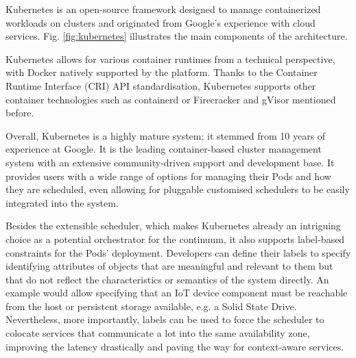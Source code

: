 Kubernetes \cite{kubernetes} is an open-source framework designed to manage containerized workloads on clusters and originated from Google's experience with cloud services. Fig. \ref{fig:kubernetes} illustrates the main components of the architecture.


Kubernetes allows for various container runtimes from a technical perspective, with Docker natively supported by the platform. Thanks to the Container Runtime Interface (CRI) API standardisation, Kubernetes supports other container technologies such as containerd \cite{containerd} or Firecracker and gVisor mentioned before.


Overall, Kubernetes is a highly mature system; it stemmed from 10 years of experience at Google. It is the leading container-based cluster management system with an extensive community-driven support and development base. It provides users with a wide range of options for managing their Pods and how they are scheduled, even allowing for pluggable customised schedulers to be easily integrated into the system.

Besides the extensible scheduler, which makes Kubernetes already an intriguing choice as a potential orchestrator for the continuum, it also supports label-based constraints for the Pods' deployment. Developers can define their labels to specify identifying attributes of objects that are meaningful and relevant to them but that do not reflect the characteristics or semantics of the system directly. An example would allow specifying that an IoT device component must be reachable from the host or persistent storage available, e.g. a Solid State Drive. Nevertheless, more importantly, labels can be used to force the scheduler to colocate services that communicate a lot into the same availability zone, improving the latency drastically and paving the way for context-aware services. %

